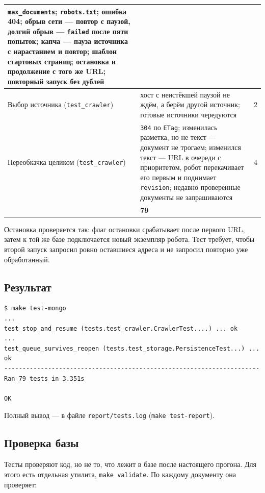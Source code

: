\begin{center}
\begin{longtable}{|>{\raggedright\arraybackslash}p{4.8cm}|>{\raggedright\arraybackslash}p{8.2cm}|r|}
    \texttt{max\_documents}; \texttt{robots.txt}; ошибка 404; \textbf{обрыв
    сети --- повтор с паузой}, долгий обрыв --- \texttt{failed} после пяти
    попыток; капча --- пауза источника с нарастанием и повтор; шаблон стартовых
    страниц; \textbf{остановка и продолжение с того же URL}; повторный запуск
    без дублей & 13 \\
\hline
Выбор источника (\texttt{test\_crawler})
  & хост с неистёкшей паузой не ждём, а берём другой источник; готовые
    источники чередуются & 2 \\
\hline
Переобкачка целиком (\texttt{test\_crawler})
  & \texttt{304} по \texttt{ETag}; изменилась разметка, но не текст --- документ
    не трогаем; изменился текст --- URL в очереди с приоритетом, робот
    перекачивает его первым и поднимает \texttt{revision}; недавно
    проверенные документы не запрашиваются & 4 \\
\hline
\multicolumn{2}{|r|}{\textbf{Всего}} & \textbf{79} \\
\hline
\end{longtable}
\end{center}

Остановка проверяется так: флаг остановки срабатывает после первого URL, затем
к той же базе подключается новый экземпляр робота. Тест требует,
чтобы второй запуск запросил ровно оставшиеся адреса и не запросил повторно
уже обработанный.

\subsection*{Результат}

\begin{verbatim}
$ make test-mongo
...
test_stop_and_resume (tests.test_crawler.CrawlerTest....) ... ok
...
test_queue_survives_reopen (tests.test_storage.PersistenceTest...) ... ok
----------------------------------------------------------------------
Ran 79 tests in 3.351s

OK
\end{verbatim}

Полный вывод --- в файле \texttt{report/tests.log} (\texttt{make test-report}).

\subsection*{Проверка базы}

Тесты проверяют код, но не то, что лежит в базе после настоящего прогона. Для
этого есть отдельная утилита, \texttt{make validate}. По каждому документу она
проверяет:

